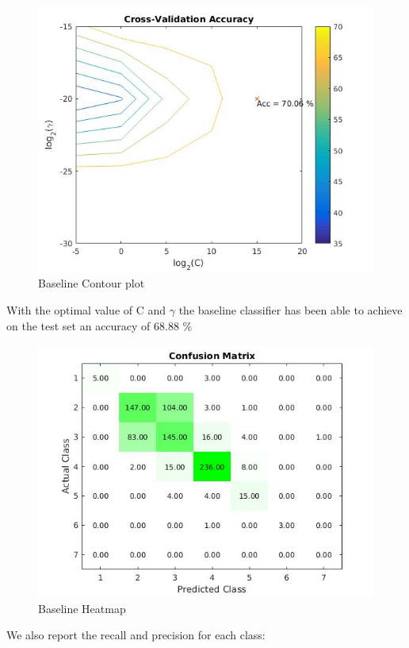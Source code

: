 \documentclass[a4paper,10pt]{article}
\begin{document}
      \begin{figure}[H]
	\centering
	\includegraphics[scale=0.5]{baseline.jpg}
	\caption{Baseline Contour plot}
      \end{figure}
      With the optimal value of C and $\gamma$ the baseline classifier has been able to achieve on the test set an accuracy of 68.88 \% \newline
      \begin{figure}[H]
	\centering
	\includegraphics[scale=0.5]{conf_matrix_baseline.jpg}
	\caption{Baseline Heatmap}
      \end{figure}
      \noindent We also report the recall and precision for each class:\newline
      
\end{document}
